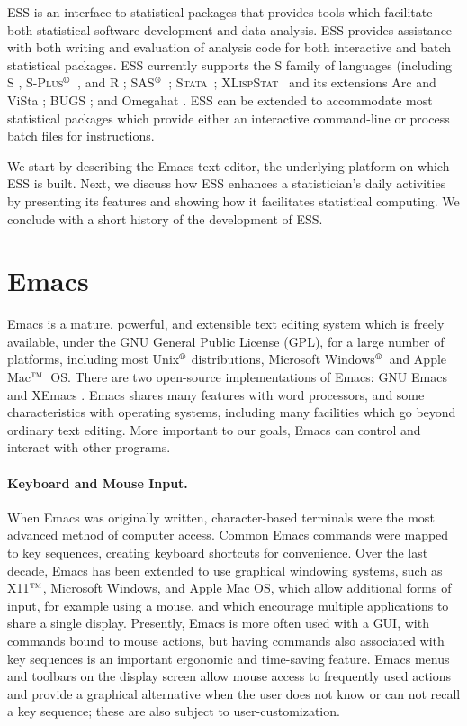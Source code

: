 \documentclass{article}
\newcommand*{\regstrd}{$^{\mbox{\scriptsize{\textregistered}}}$}
\newcommand*{\tm}{$^{\mbox{\scriptsize\sc tm}}$}
\newcommand*{\SAS}{\textsc{SAS}}
\newcommand*{\Splus}{\textsc{S-Plus}}
\newcommand*{\XLispStat}{\textsc{XLispStat}}
\newcommand*{\Stata}{\textsc{Stata}}
\begin{document}
ESS is an interface to statistical packages that provides tools which
facilitate both statistical software development and data analysis.
ESS provides assistance with both writing and evaluation of analysis
code for both interactive and batch statistical packages.  ESS
currently supports the S family of languages (including S
\citep{BecRCW88,ChaJH92,ChaJ98}, \Splus\regstrd\ \citep{Splus}, and R
\citep{ihak:gent:1996,R}; \SAS\regstrd\ \citep{SAS:8}; \Stata\ 
\citep{Stata:7.0}; \XLispStat\ \citep{Tier90} and its extensions Arc
\citep{Cook:Weisberg:1999} and ViSta \citep{youn:fald:mcfa:1992}; BUGS
\citep{BUGS}; and Omegahat \citep{DTLang:2000}.  ESS can be extended
to accommodate most statistical packages which provide either an
interactive command-line or process batch files for instructions.

We start by describing the Emacs text editor, the underlying platform
on which ESS is built.  Next, we discuss how ESS enhances a
statistician's daily activities by presenting its features and showing
how it facilitates statistical computing.  We conclude with a short history 
of the development of ESS.

\section{Emacs}
\label{sec:emacs}

Emacs is a mature, powerful, and extensible text editing system which
is freely available, under the GNU General Public License (GPL), for a
large number of platforms, including most Unix\regstrd
distributions, Microsoft Windows\regstrd\ and Apple Mac\tm\ OS.  There
are two open-source implementations of Emacs: GNU Emacs
\citep{GNU-Emacs} and XEmacs \citep{XEmacs}.  Emacs shares many
features with word processors, and some characteristics with operating
systems, including many facilities which go beyond ordinary text
editing.  More important to our goals, Emacs can control and interact
with other programs.

\paragraph{Keyboard and Mouse Input.}
When Emacs was originally written, character-based terminals were the
most advanced method of computer access.  Common Emacs commands were
mapped to key sequences, creating keyboard shortcuts for convenience.
Over the last decade, Emacs has been extended to use graphical
windowing systems, such as X11\tm, Microsoft Windows, and Apple Mac
OS, which allow additional forms of input, for example using a mouse,
and which encourage multiple applications to share a single display.
Presently, Emacs is more often used with a GUI, with commands bound to
mouse actions, but having commands also associated with key sequences
is an important ergonomic and time-saving feature.  Emacs menus and
toolbars on the display screen allow mouse access to frequently used
actions and provide a graphical alternative when the user does not
know or can not recall a key sequence; these are also subject to
user-customization.
\end{document}
